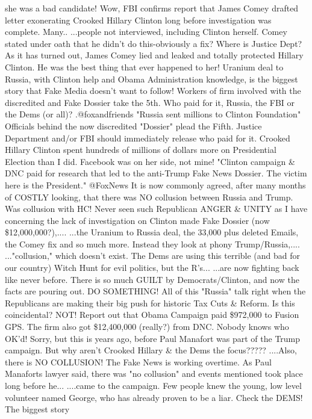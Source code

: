 she was a bad candidate! Wow, FBI confirms report that James Comey
drafted letter exonerating Crooked Hillary Clinton long before
investigation was complete. Many.. ...people not interviewed, including
Clinton herself. Comey stated under oath that he didn't do
this-obviously a fix? Where is Justice Dept? As it has turned out, James
Comey lied and leaked and totally protected Hillary Clinton. He was the
best thing that ever happened to her! Uranium deal to Russia, with
Clinton help and Obama Administration knowledge, is the biggest story
that Fake Media doesn't want to follow! Workers of firm involved with
the discredited and Fake Dossier take the 5th. Who paid for it, Russia,
the FBI or the Dems (or all)? .@foxandfriends "Russia sent millions to
Clinton Foundation" Officials behind the now discredited "Dossier" plead
the Fifth. Justice Department and/or FBI should immediately release who
paid for it. Crooked Hillary Clinton spent hundreds of millions of
dollars more on Presidential Election than I did. Facebook was on her
side, not mine! "Clinton campaign \& DNC paid for research that led to
the anti-Trump Fake News Dossier. The victim here is the President."
@FoxNews It is now commonly agreed, after many months of COSTLY looking,
that there was NO collusion between Russia and Trump. Was collusion with
HC! Never seen such Republican ANGER \& UNITY as I have concerning the
lack of investigation on Clinton made Fake Dossier (now
\$12,000,000?),.... ...the Uranium to Russia deal, the 33,000 plus
deleted Emails, the Comey fix and so much more. Instead they look at
phony Trump/Russia,.... ..."collusion," which doesn't exist. The Dems
are using this terrible (and bad for our country) Witch Hunt for evil
politics, but the R's... ...are now fighting back like never before.
There is so much GUILT by Democrats/Clinton, and now the facts are
pouring out. DO SOMETHING! All of this "Russia" talk right when the
Republicans are making their big push for historic Tax Cuts \& Reform.
Is this coincidental? NOT! Report out that Obama Campaign paid \$972,000
to Fusion GPS. The firm also got \$12,400,000 (really?) from DNC. Nobody
knows who OK'd! Sorry, but this is years ago, before Paul Manafort was
part of the Trump campaign. But why aren't Crooked Hillary \& the Dems
the focus????? ....Also, there is NO COLLUSION! The Fake News is working
overtime. As Paul Manaforts lawyer said, there was "no collusion" and
events mentioned took place long before he... ....came to the campaign.
Few people knew the young, low level volunteer named George, who has
already proven to be a liar. Check the DEMS! The biggest story
